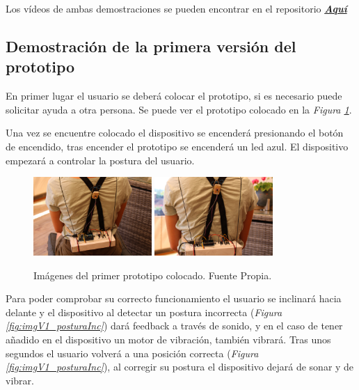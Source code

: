 Los vídeos de ambas demostraciones se pueden encontrar en el repositorio \href{https://github.com/NaiaraGadea/TFG_DispositivoDeControlPostural/tree/main/videos}{\textbf{\textit{Aquí}}}


\subsection{Demostración de la primera versión del prototipo}

En primer lugar el usuario se deberá colocar el prototipo, si es necesario puede solicitar ayuda a otra persona. Se puede ver el prototipo colocado en la \textit{Figura \ref{fig:imgDispositivo_V1}}.

Una vez se encuentre colocado el dispositivo se encenderá presionando el botón de encendido, tras encender el prototipo se encenderá un led azul. El dispositivo empezará a controlar la postura del usuario.


\begin{figure}[h!]
    \centering
    \includegraphics[width=0.4\textwidth]{img/Disp_V1_1.jpg}
    \includegraphics[width=0.4\textwidth]{img/Disp_V1_2.jpg}
    \caption{Imágenes del primer prototipo colocado. Fuente Propia.}
    \label{fig:imgDispositivo_V1} 
\end{figure}

Para poder comprobar su correcto funcionamiento el usuario se inclinará hacia delante y el dispositivo al detectar un postura incorrecta (\textit{Figura \ref{fig:imgV1_posturaInc}}) dará feedback a través de sonido, y en el caso de tener añadido en el dispositivo un motor de vibración, también vibrará. Tras unos segundos el usuario volverá a una posición correcta (\textit{Figura \ref{fig:imgV1_posturaInc}}), al corregir su postura el dispositivo dejará de sonar y de vibrar.

